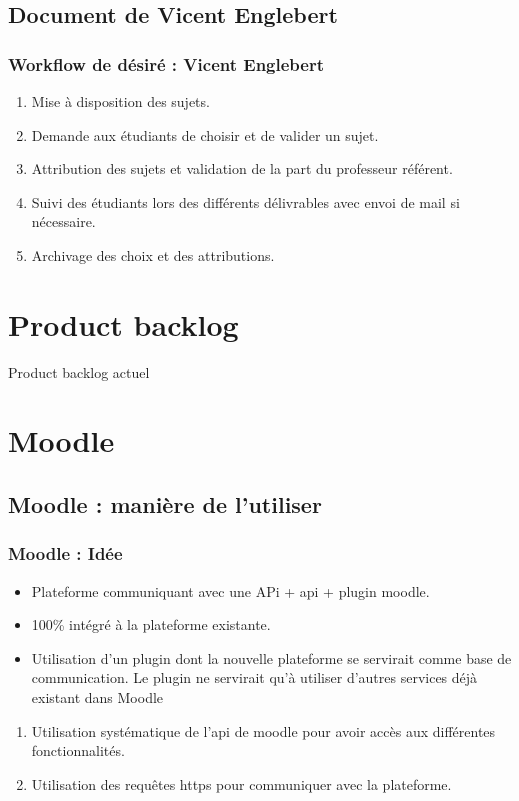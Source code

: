 \documentclass[numbering=fraction]{beamer}
\begin{document}
\subsection{Document de Vicent Englebert}
\begin{frame}
    \frametitle{Workflow de désiré : Vicent Englebert}
    \begin{enumerate}
        \item Mise à disposition des sujets.
        \item Demande aux étudiants de choisir et de valider un sujet.
        \item Attribution des sujets et validation de la part du professeur référent.
        \item Suivi des étudiants lors des différents délivrables avec envoi de mail si nécessaire.
        \item Archivage des choix et des attributions.
    \end{enumerate}


\end{frame}

\section{Product backlog}

\begin{frame}{Product backlog actuel}

\end{frame}
\section{Moodle}
\subsection{Moodle : manière de l'utiliser}
\begin{frame}
    \frametitle{Moodle : Idée}
    \begin{itemize}
        \item Plateforme communiquant avec une APi + api + plugin moodle.
        \item 100\% intégré à la plateforme existante.
        \item Utilisation d'un plugin dont la nouvelle plateforme se servirait comme base de communication. Le plugin
        ne servirait qu'à utiliser d'autres services déjà existant dans Moodle
    \end{itemize}   
    \begin{enumerate}
        \item Utilisation systématique de l'api de moodle pour avoir accès aux différentes fonctionnalités.
        \item Utilisation des requêtes https pour communiquer avec la plateforme.
    \end{enumerate}

\end{frame}
\end{document}
